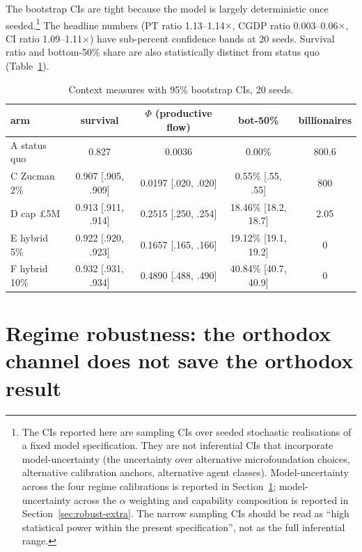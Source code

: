 \documentclass[11pt]{article}
\begin{document}
The bootstrap CIs are tight because the model is largely deterministic
once seeded.\footnote{The CIs reported here are sampling CIs over
seeded stochastic realisations of a fixed model specification.  They
are not inferential CIs that incorporate model-uncertainty (the
uncertainty over alternative microfoundation choices, alternative
calibration anchors, alternative agent classes).  Model-uncertainty
across the four regime calibrations is reported in
Section~\ref{sec:robust}; model-uncertainty across the $\alpha$
weighting and capability composition is reported in
Section~\ref{sec:robust-extra}.  The narrow sampling CIs should be
read as ``high statistical power within the present specification'',
not as the full inferential range.}  The headline numbers (PT ratio
1.13--1.14$\times$, CGDP ratio 0.003--0.06$\times$, CI ratio
1.09--1.11$\times$) have sub-percent confidence bands at 20 seeds.  Survival ratio and
bottom-50\% share are also statistically distinct from status quo
(Table~\ref{tab:context-cis}).

\begin{table}[h]
\centering
\small
\caption{Context measures with 95\% bootstrap CIs, 20 seeds.}
\label{tab:context-cis}
\begin{tabular}{lcccc}
\toprule
arm & survival & $\Phi$ (productive flow) & bot-50\% & billionaires \\
\midrule
A status quo     & 0.827          & 0.0036         &  0.00\% & 800.6 \\
C Zucman 2\%     & 0.907 [.905, .909] & 0.0197 [.020, .020] &  0.55\% [.55, .55] & 800 \\
D cap \pounds 5M & 0.913 [.911, .914] & 0.2515 [.250, .254] & 18.46\% [18.2, 18.7] & 2.05 \\
E hybrid 5\%     & 0.922 [.920, .923] & 0.1657 [.165, .166] & 19.12\% [19.1, 19.2] & 0 \\
F hybrid 10\%    & 0.932 [.931, .934] & 0.4890 [.488, .490] & 40.84\% [40.7, 40.9] & 0 \\
\bottomrule
\end{tabular}
\end{table}

\section{Regime robustness: the orthodox channel does not save the orthodox result}
\label{sec:robust}
\end{document}
